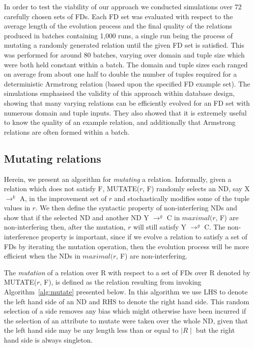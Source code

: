 In order to test the viability of our approach we conducted simulations
over 72 carefully chosen sets of FDs. 
 Each FD set was evaluated with respect to the average length of the
 evolution process and the final quality of the relations
 produced in batches
containing 1,000 runs, a single run being the process of mutating
a randomly generated relation until the given FD set is satisfied.
This was performed for around 80 batches, varying over domain and tuple
size which were both held constant within a batch. The domain and tuple
sizes each ranged on average from about one 
half to double the number of tuples required for a deterministic
Armstrong relation (based upon the specified FD example set).  The simulations
emphasised the validity of this approach within database
design, showing that many varying relations can be efficiently
evolved for an FD set with numerous domain and tuple inputs.
 They also showed that it is extremely useful to know the quality of an
 example relation, and additionally that Armstrong
relations are often formed within a batch. 



\subsection{Mutating relations}
\label{sec:mutate}

Herein, we present an algorithm for {\em mutating} a relation.
Informally, given a relation which does not satisfy F, MUTATE($r$, F) 
randomly selects an ND, say X $\to^k$ A, in the improvement set of $r$ and 
stochastically modifies some of the tuple values in $r$.
We then define the syntactic property of non-interfering NDs 
and show that if the selected ND and another ND
Y $\to^g$ C in $maximal(r$, F) are non-interfering then, after the mutation, 
$r$ will still satisfy Y $\to^g$ C.
The non-interference property is important,
since if we evolve a relation to satisfy a set of FDs by iterating the
mutation operation, then the evolution process will be more efficient 
when the NDs in $maximal(r$, F) are non-interfering.

\medskip

The {\em mutation} of a relation over R with respect to a set of FDs over R 
denoted by MUTATE($r$, F), is defined as the relation resulting from invoking 
Algorithm~\ref{alg:mutate} presented below. In this algorithm we use LHS
 to denote the left hand side of an ND and RHS to denote the right hand
side.  This random selection of a side removes any bias which might otherwise
have been incurred if the selection of an attribute to mutate were
taken over the whole ND, given that the left hand side may be any
length less than or equal to $\mid R \mid$ but the right hand side is always singleton.


